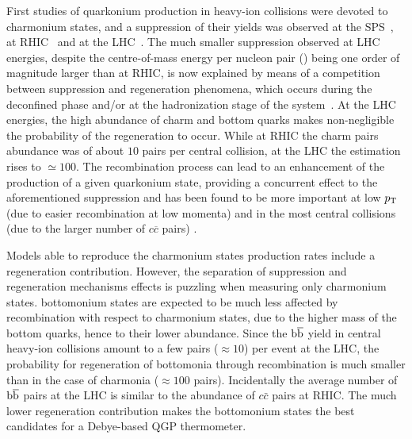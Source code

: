 First studies of quarkonium production in heavy-ion collisions were devoted to charmonium states, and a suppression of their yields was observed at the SPS~\cite{abreu:in2p3-00002434,Alessandro:2004ap,Arnaldi:2007zz}, at RHIC~\cite{Adare:2011yf,Abelev:2009qaa} and at the LHC~\cite{Abelev:2012rv,Chatrchyan:2012np,Adam:2016rdg}. 
The much smaller \jpsi suppression observed at LHC energies, despite the centre-of-mass energy per nucleon pair (\snn) being one order of magnitude larger than at RHIC, is now explained by means of a competition between suppression and regeneration phenomena, which occurs during the deconfined phase and/or at the hadronization stage of the system~\cite{BraunMunzinger:2000px,Thews:2000rj,Zhao:2011cv,Zhou:2014kka}.
At the LHC energies, the high abundance of charm and bottom quarks  makes non-negligible the probability of the regeneration to occur.
While at RHIC the charm pairs abundance was of about $10$ pairs per central collision, at the LHC the estimation rises to $\simeq100$.
The recombination process can lead to an enhancement of the production of a given quarkonium state, providing a concurrent effect to the aforementioned suppression and has been found to be more important at low $p_{\rm T}$ (due to easier recombination at low momenta) and in the most central collisions (due to the larger number of $c\overline{c}$ pairs) \cite{Abelev:2013ila,Adam:2015isa}.

Models able to reproduce the charmonium states production rates include a regeneration contribution.
However, the separation of suppression and regeneration mechanisms effects is puzzling when measuring only charmonium states.
bottomonium states are expected to be much less affected by recombination with respect to charmonium states, due to the higher mass of the bottom quarks, hence to their lower abundance.
Since the  ${\rm b{\overline b}}$ yield in central heavy-ion collisions amount to a few pairs ($\approx 10$) per event at the LHC, the probability for regeneration of bottomonia through recombination is much smaller than in the case of charmonia ($\approx 100$ pairs).
Incidentally the average number of ${\rm b{\overline b}}$ pairs at the LHC is similar to the abundance of $c\bar{c}$ pairs at RHIC.
The much lower regeneration contribution makes the bottomonium states the best candidates for a Debye-based QGP thermometer.

